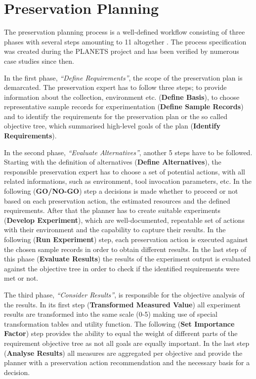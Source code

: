 \section{Preservation Planning}
The preservation planning process is a well-defined workflow consisting of three phases with several steps amounting to 11 altogether \cite{STR07_jcdl}. The process specification was created during the PLANETS project and has been verified by numerous case studies since then. 

In the first phase, \textit{``Define Requirements''}, the scope of the preservation plan is demarcated. The preservation expert has to follow three steps; to provide information about the collection, environment etc. (\textbf{Define Basis}), to choose representative sample records for experimentation (\textbf{Define Sample Records}) and to identify the requirements for the preservation plan or the so called objective tree, which summarised high-level goals of the plan (\textbf{Identify Requirements}). 

In the second phase, \textit{``Evaluate Alternatives''}, another 5 steps have to be followed. Starting with the definition of alternatives (\textbf{Define Alternatives}), the responsible preservation expert has to choose a set of potential actions, with all related informations, such as environment, tool invocation parameters, etc. In the following (\textbf{GO/NO-GO}) step a decisions is made whether to proceed or not based on each preservation action, the estimated resources and the defined requirements. After that the planner has to create suitable experiments (\textbf{Develop Experiment}), which are well-documented, repeatable set of actions with their environment and the capability to capture their results. In the following (\textbf{Run Experiment}) step, each preservation action is executed against the chosen sample records in order to obtain different results. In the last step of this phase (\textbf{Evaluate Results}) the results of the experiment output is evaluated against the objective tree in order to check if the identified requirements were met or not.

The third phase, \textit{``Consider Results''}, is responsible for the objective analysis of the results. In its first step (\textbf{Transformed Measured Value}) all experiment results are transformed into the same scale (0-5) making use of special transformation tables and utility function. The following (\textbf{Set Importance Factor}) step provides the ability to equal the weight of different parts of the requirement objective tree as not all goals are equally important. In the last step (\textbf{Analyse Results}) all measures are aggregated per objective and provide the planner with a preservation action recommendation and the necessary basis for a decision.

